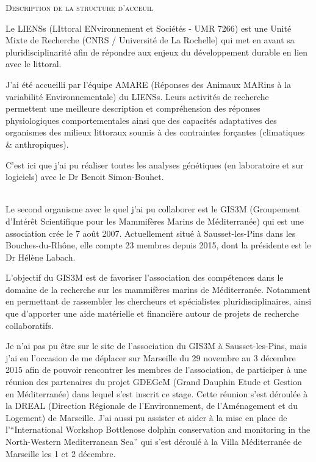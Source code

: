 \documentclass[a4paper,12pt,twoside]{article}\usepackage[]{graphicx}\usepackage[]{color}
\begin{document}
\begin{center}
 \textsc{\LARGE Description de la structure d'acceuil}\\[2cm]
\end{center}

Le LIENSs (LIttoral ENvironnement et Sociétés - UMR 7266) est une Unité Mixte de Recherche (CNRS / Université de La Rochelle) qui met en avant sa pluridisciplinarité afin de répondre aux enjeux du développement durable en lien avec le littoral.

J’ai été accueilli par l’équipe AMARE (Réponses des Animaux MARins à la variabilité Environnementale) du LIENSs. Leurs activités de recherche permettent une meilleure description et compréhension des réponses physiologiques comportementales ainsi que des capacités adaptatives des organismes des milieux littoraux soumis à des contraintes forçantes (climatiques & anthropiques). 

C'est ici que j'ai pu réaliser toutes les analyses génétiques (en laboratoire et sur logiciels) avec le Dr Benoit Simon-Bouhet.

~~\\

Le second organisme avec le quel j'ai pu collaborer est le GIS3M (Groupement d’Intérêt Scientifique pour les Mammifères Marins de Méditerranée) qui est une association crée le 7 août 2007. Actuellement situé à Sausset-les-Pins dans les Bouches-du-Rhône, elle compte 23 membres depuis 2015, dont la présidente est le Dr Hélène Labach.

L’objectif du GIS3M est de favoriser l'association des compétences dans le domaine de la recherche sur les mammifères marins de Méditerranée. Notamment en permettant de rassembler les chercheurs et spécialistes pluridisciplinaires, ainsi que d'apporter une aide matérielle et financière autour de projets de recherche collaboratifs.

Je n'ai pas pu être sur le site de l'association du GIS3M à Sausset-les-Pins, mais j'ai eu l'occasion de me déplacer sur Marseille du 29 novembre au 3 décembre 2015 afin de pouvoir rencontrer les membres de l'association, de participer à une réunion des partenaires du projet GDEGeM (Grand Dauphin Etude et Gestion en Méditerranée) dans lequel s'est inscrit ce stage. Cette réunion s'est déroulée à la DREAL (Direction Régionale de l'Environnement, de l'Aménagement et du Logement) de Marseille. J'ai aussi pu assister et aider à la mise en place de l'``International Workshop Bottlenose dolphin conservation and monitoring in the North-Western Mediterranean Sea'' qui s'est déroulé à la Villa Méditerranée de Marseille les 1 et 2 décembre.
\end{document}
